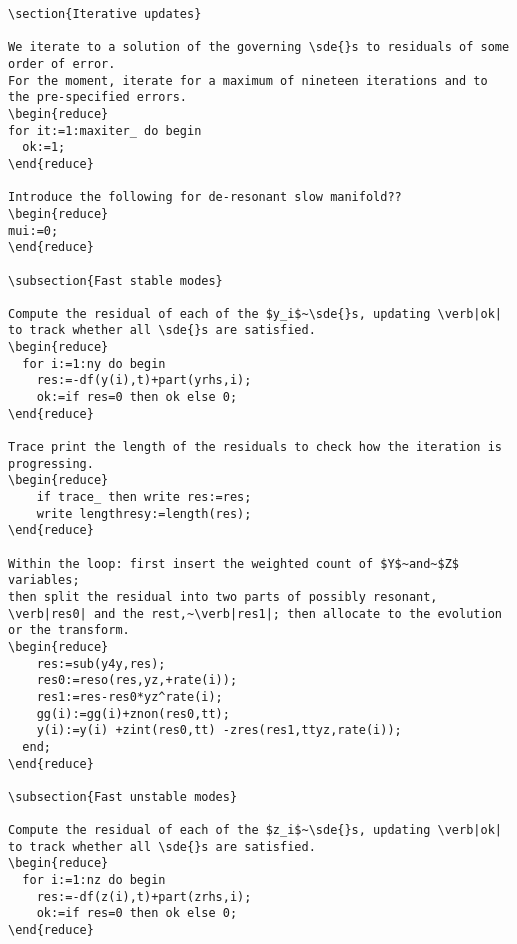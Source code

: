 \documentclass[11pt,a5paper]{article}
\begin{document}
\begin{reduce}
\begin{verbatim}
\section{Iterative updates}

We iterate to a solution of the governing \sde{}s to residuals of some order of error.
For the moment, iterate for a maximum of nineteen iterations and to the pre-specified errors.
\begin{reduce}
for it:=1:maxiter_ do begin
  ok:=1;
\end{reduce}

Introduce the following for de-resonant slow manifold??
\begin{reduce}
mui:=0;
\end{reduce}

\subsection{Fast stable modes}

Compute the residual of each of the $y_i$~\sde{}s, updating \verb|ok| to track whether all \sde{}s are satisfied.
\begin{reduce}
  for i:=1:ny do begin  
    res:=-df(y(i),t)+part(yrhs,i);
    ok:=if res=0 then ok else 0;
\end{reduce}

Trace print the length of the residuals to check how the iteration is progressing.
\begin{reduce}
    if trace_ then write res:=res;
    write lengthresy:=length(res);
\end{reduce}

Within the loop: first insert the weighted count of $Y$~and~$Z$ variables;
then split the residual into two parts of possibly resonant, \verb|res0| and the rest,~\verb|res1|; then allocate to the evolution or the transform.
\begin{reduce}
    res:=sub(y4y,res);
    res0:=reso(res,yz,+rate(i));
    res1:=res-res0*yz^rate(i);
    gg(i):=gg(i)+znon(res0,tt);
    y(i):=y(i) +zint(res0,tt) -zres(res1,ttyz,rate(i));
  end;
\end{reduce}

\subsection{Fast unstable modes}

Compute the residual of each of the $z_i$~\sde{}s, updating \verb|ok| to track whether all \sde{}s are satisfied.
\begin{reduce}
  for i:=1:nz do begin  
    res:=-df(z(i),t)+part(zrhs,i);
    ok:=if res=0 then ok else 0;
\end{reduce}


\end{verbatim}
\end{reduce}
\end{document}
